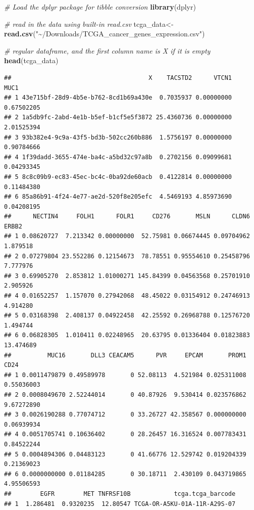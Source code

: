 \documentclass[
]{book}
\newenvironment{Shaded}{\begin{snugshade}}{\end{snugshade}}
\newcommand{\CommentTok}[1]{\textcolor[rgb]{0.56,0.35,0.01}{\textit{#1}}}
\newcommand{\FunctionTok}[1]{\textcolor[rgb]{0.13,0.29,0.53}{\textbf{#1}}}
\newcommand{\NormalTok}[1]{#1}
\newcommand{\OtherTok}[1]{\textcolor[rgb]{0.56,0.35,0.01}{#1}}
\newcommand{\StringTok}[1]{\textcolor[rgb]{0.31,0.60,0.02}{#1}}
\begin{document}
\begin{Shaded}
\begin{Highlighting}[]
\CommentTok{\# Load the dplyr package for tibble conversion}
\FunctionTok{library}\NormalTok{(dplyr)}

\CommentTok{\# read in the data using built{-}in read.csv}
\NormalTok{tcga\_data}\OtherTok{\textless{}{-}} \FunctionTok{read.csv}\NormalTok{(}\StringTok{"\textasciitilde{}/Downloads/TCGA\_cancer\_genes\_expression.csv"}\NormalTok{)}

\CommentTok{\# regular dataframe, and the first column name is X if it is empty}
\FunctionTok{head}\NormalTok{(tcga\_data)}
\end{Highlighting}
\end{Shaded}

\begin{verbatim}
##                                      X    TACSTD2      VTCN1       MUC1
## 1 43e715bf-28d9-4b5e-b762-8cd1b69a430e  0.7035937 0.00000000 0.67502205
## 2 1a5db9fc-2abd-4e1b-b5ef-b1cf5e5f3872 25.4360736 0.00000000 2.01525394
## 3 93b382e4-9c9a-43f5-bd3b-502cc260b886  1.5756197 0.00000000 0.90784666
## 4 1f39dadd-3655-474e-ba4c-a5bd32c97a8b  0.2702156 0.09099681 0.04293345
## 5 8c8c09b9-ec83-45ec-bc4c-0ba92de60acb  0.4122814 0.00000000 0.11484380
## 6 85a86b91-4f24-4e77-ae2d-520f8e205efc  4.5469193 4.85973690 0.04208195
##      NECTIN4     FOLH1      FOLR1     CD276       MSLN      CLDN6     ERBB2
## 1 0.08620727  7.213342 0.00000000  52.75981 0.06674445 0.09704962  1.879518
## 2 0.07279804 23.552286 0.12154673  78.78551 0.95554610 0.25458796  7.777976
## 3 0.69905270  2.853812 1.01000271 145.84399 0.04563568 0.25701910  2.905926
## 4 0.01652257  1.157070 0.27942068  48.45022 0.03154912 0.24746913  4.914280
## 5 0.03168398  2.408137 0.04922458  42.25592 0.26968788 0.12576720  1.494744
## 6 0.06828305  1.010411 0.02248965  20.63795 0.01336404 0.01823883 13.474689
##          MUC16       DLL3 CEACAM5      PVR     EPCAM       PROM1       CD24
## 1 0.0011479879 0.49589978       0 52.08113  4.521984 0.025311008 0.55036003
## 2 0.0008049670 2.52244014       0 40.87926  9.530414 0.023576862 9.67272890
## 3 0.0026190288 0.77074712       0 33.26727 42.358567 0.000000000 0.06939934
## 4 0.0051705741 0.10636402       0 28.26457 16.316524 0.007783431 0.84522244
## 5 0.0004894306 0.04483123       0 41.66776 12.529742 0.019204339 0.21369023
## 6 0.0000000000 0.01184285       0 30.18711  2.430109 0.043719865 4.95506593
##        EGFR        MET TNFRSF10B            tcga.tcga_barcode
## 1  1.286481  0.9320235  12.80547 TCGA-OR-A5KU-01A-11R-A29S-07

\end{verbatim}
\end{document}
